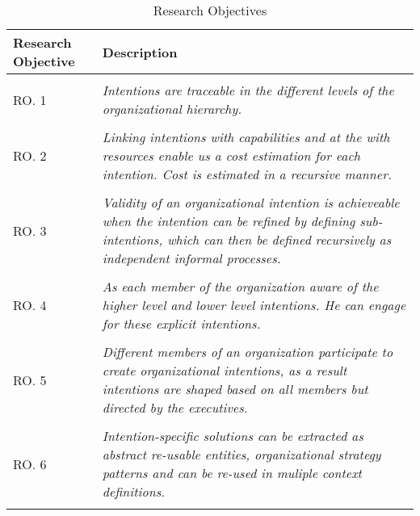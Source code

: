 \label{sec:researchobj}
\begin{center}
	\begin{longtable}{p{5cm}p{11cm}} 
   	\toprule 
	\textbf{Research Objective} & \textbf{Description} \\
	\midrule
	\endfirsthead
	\\
	RO. 1 & \textit{Intentions are traceable in the different levels of the organizational hierarchy. }  \label{ro1} \\
	\\[-1.5ex]
	RO. 2 & \textit{Linking intentions with capabilities and at the with resources enable us a cost estimation for each intention. Cost is estimated in a recursive manner.}  \label{ro2} \\
	\\[-1.5ex]
	RO. 3 & \textit{Validity of an organizational intention is achieveable when the intention can be refined by defining sub-intentions, which can then be defined recursively as independent informal processes.} \label{ro3}\\
	\\[-1.5ex]
	RO. 4 & \textit{As each member of the organization aware of the higher level and lower level intentions. He can engage for these explicit intentions. }  \label{ro4}\\
	\\[-1.5ex]
	RO. 5 & \textit{Different members of an organization participate to create organizational intentions, as a result intentions are shaped based on all members but directed by the executives.}\label{ro5}\\
	\\[-1.5ex]
	RO. 6 & \textit{Intention-specific solutions can be extracted as abstract re-usable entities, organizational strategy patterns and can be re-used in muliple context definitions.} \label{ro6}\\
	
	\bottomrule
	\caption{Research Objectives}
	\label{tab:researchobjectives}
	\end{longtable}	
\end{center}

